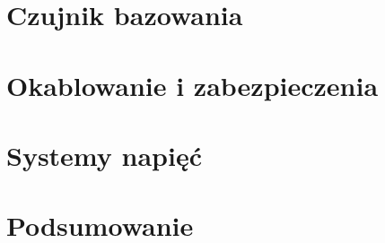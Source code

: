 
\section{Czujnik bazowania}
\label{sec:ch3_czujnik_bazowania}


\section{Okablowanie i zabezpieczenia}
\label{sec:ch3_okablowanie_zabezpieczenia}


\section{Systemy napięć}
\label{sec:ch3_systemy_napiec}


\section{Podsumowanie}


